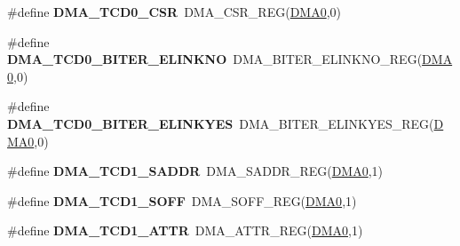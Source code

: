 \begin{DoxyCompactItemize}
\item 
\#define {\bfseries D\+M\+A\+\_\+\+T\+C\+D0\+\_\+\+C\+SR}~D\+M\+A\+\_\+\+C\+S\+R\+\_\+\+R\+EG(\hyperlink{group__DMA__Peripheral__Access__Layer_ga4103044f9ca209772f513dc694513ffb}{D\+M\+A0},0)\hypertarget{group__DMA__Register__Accessor__Macros_gac6c6031712fe92a2e0866b5cdaedbc09}{}\label{group__DMA__Register__Accessor__Macros_gac6c6031712fe92a2e0866b5cdaedbc09}

\item 
\#define {\bfseries D\+M\+A\+\_\+\+T\+C\+D0\+\_\+\+B\+I\+T\+E\+R\+\_\+\+E\+L\+I\+N\+K\+NO}~D\+M\+A\+\_\+\+B\+I\+T\+E\+R\+\_\+\+E\+L\+I\+N\+K\+N\+O\+\_\+\+R\+EG(\hyperlink{group__DMA__Peripheral__Access__Layer_ga4103044f9ca209772f513dc694513ffb}{D\+M\+A0},0)\hypertarget{group__DMA__Register__Accessor__Macros_ga96730875a7b5ef4cc612fca19996a011}{}\label{group__DMA__Register__Accessor__Macros_ga96730875a7b5ef4cc612fca19996a011}

\item 
\#define {\bfseries D\+M\+A\+\_\+\+T\+C\+D0\+\_\+\+B\+I\+T\+E\+R\+\_\+\+E\+L\+I\+N\+K\+Y\+ES}~D\+M\+A\+\_\+\+B\+I\+T\+E\+R\+\_\+\+E\+L\+I\+N\+K\+Y\+E\+S\+\_\+\+R\+EG(\hyperlink{group__DMA__Peripheral__Access__Layer_ga4103044f9ca209772f513dc694513ffb}{D\+M\+A0},0)\hypertarget{group__DMA__Register__Accessor__Macros_ga2521a084ea42e98eeceb804e5f7ecb76}{}\label{group__DMA__Register__Accessor__Macros_ga2521a084ea42e98eeceb804e5f7ecb76}

\item 
\#define {\bfseries D\+M\+A\+\_\+\+T\+C\+D1\+\_\+\+S\+A\+D\+DR}~D\+M\+A\+\_\+\+S\+A\+D\+D\+R\+\_\+\+R\+EG(\hyperlink{group__DMA__Peripheral__Access__Layer_ga4103044f9ca209772f513dc694513ffb}{D\+M\+A0},1)\hypertarget{group__DMA__Register__Accessor__Macros_ga94212bd95654bfd40e69abc92d60ba81}{}\label{group__DMA__Register__Accessor__Macros_ga94212bd95654bfd40e69abc92d60ba81}

\item 
\#define {\bfseries D\+M\+A\+\_\+\+T\+C\+D1\+\_\+\+S\+O\+FF}~D\+M\+A\+\_\+\+S\+O\+F\+F\+\_\+\+R\+EG(\hyperlink{group__DMA__Peripheral__Access__Layer_ga4103044f9ca209772f513dc694513ffb}{D\+M\+A0},1)\hypertarget{group__DMA__Register__Accessor__Macros_ga2ef23070556cc663eb4b1189fb07e121}{}\label{group__DMA__Register__Accessor__Macros_ga2ef23070556cc663eb4b1189fb07e121}

\item 
\#define {\bfseries D\+M\+A\+\_\+\+T\+C\+D1\+\_\+\+A\+T\+TR}~D\+M\+A\+\_\+\+A\+T\+T\+R\+\_\+\+R\+EG(\hyperlink{group__DMA__Peripheral__Access__Layer_ga4103044f9ca209772f513dc694513ffb}{D\+M\+A0},1)\hypertarget{group__DMA__Register__Accessor__Macros_ga39a0c29d2a82a8e6bd8f88bb52ab5210}{}\label{group__DMA__Register__Accessor__Macros_ga39a0c29d2a82a8e6bd8f88bb52ab5210}


\end{DoxyCompactItemize}
